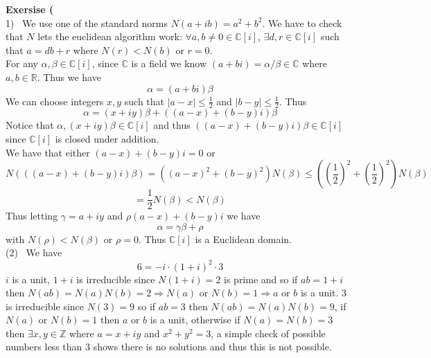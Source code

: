 \documentclass[12pt]{article}
\newenvironment{ques}[1]{\textbf{Exersise #1}\vspace{1 mm}\\ }{\bigskip}
\theoremstyle{definition}
\renewcommand{\l}{\left }
\renewcommand{\r}{\right }
\newcommand{\R}{\mathbb R}
\newcommand{\Z}{\mathbb Z}
\newcommand{\C}{\mathbb C}
\begin{document}
\begin{ques}{5.4}
	(1) \ We use one of the standard norms $N(a + ib) = a^2 + b^2$. We have to
	check that $N$ lets the euclidean algorithm work: $\forall a, b \neq 0 \in \C[i]$,
	$\exists d, r \in \C[i]$ such that $a = db + r$ where $N(r) < N(b)$ or $r = 0$. \\
	For any $\alpha, \beta \in \C[i]$, since $\C$ is a field we know $(a + bi)
	= \alpha/\beta \in \C$ where $a,b \in \R$. Thus we have
	$$\alpha = (a + bi) \beta$$
	We can choose integers $x, y$ such that $|a - x| \leq \frac 1 2$ and $|b -
	y| \leq \frac 1 2$. Thus 
	$$\alpha  = (x + iy)\beta + \l ( (a - x) + (b - y)i\r ) \beta$$
	Notice that $\alpha, (x + iy) \beta \in \C[i]$ and thus $((a - x) + (b -
	y)i)\beta \in \C[i]$ since $\C[i]$ is closed under addition.\\
	We have that either $(a - x) + (b - y)i = 0$ or
	$$N(((a - x) + (b - y)i)\beta) = ((a - x)^2 + (b -
	y)^2)N(\beta) \leq \l(\l (\frac 1 2 \r)^2 + \l(\frac 1 2 \r)^2\r)N(\beta)$$
	$$= \frac 1 2 N(\beta) < N(\beta)$$
	Thus letting $\gamma = a + iy$ and $\rho (a - x) + (b - y)i$ we have
	$$\alpha = \gamma \beta + \rho$$
	with $N(\rho) < N(\beta)$ or $\rho = 0$. Thus $\C[i]$ is a Euclidean domain.
	\\
	(2) \ We have
	$$6 = -i \cdot (1 + i)^2 \cdot 3$$
	$i$ is a unit, $1 + i$ is irreducible since $N(1 + i) = 2$ is prime and so
	if $ab = 1 + i$ then $N(ab) = N(a)N(b) = 2 \Rightarrow N(a)$ or $N(b) = 1
	\Rightarrow a$ or $b$ is a unit. $3$ is irreducible since $N(3) = 9$ so
	if $ab = 3$ then $N(ab) = N(a)N(b) = 9$, if $N(a)$ or $N(b) = 1$ then $a$
	or $b$ is a unit, otherwise if $N(a) = N(b) = 3$ then $\exists x, y \in
	\Z$ where $a = x + iy$ and $x^2 + y^2 = 3$, a simple check of possible
	numbers less than $3$ shows there is no solutions and thus this is not
	possible.
\end{ques}
\end{document}
